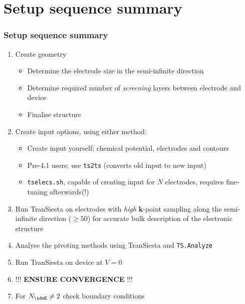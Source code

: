 \section{Setup sequence summary}

\begin{frame}
  \frametitle{Setup sequence summary}

  \begin{enumerate}%

    \item Create geometry
    \begin{itemize}
      \item Determine the electrode size in the semi-infinite direction

      \item Determine required number of \emph{screening} layers between electrode and device
      \item Finalise structure
    \end{itemize}

    \item Create input options, using either method:
    \begin{itemize}
      \item Create input yourself; chemical potential, electrodes and contours

      \item Pre-4.1 users; use \texttt{ts2ts} (converts old input to new input)

      \item \texttt{tselecs.sh}, capable of creating input for $N$ electrodes, requires
      fine-tuning afterwards(!)

    \end{itemize}
    
    \item Run TranSiesta on electrodes with \emph{high} $\mathbf k$-point sampling along
    the semi-infinite direction ($\ge50$)
    for accurate bulk description of the electronic structure

    \item Analyse the pivoting methods using TranSiesta and \texttt{TS.Analyze}

    \item Run TranSiesta on device at $V=0$

    \item !!! \textbf{ENSURE CONVERGENCE} !!!

    \item For $N_\idxE\neq2$ check boundary conditions 


\end{enumerate}
\end{frame}
